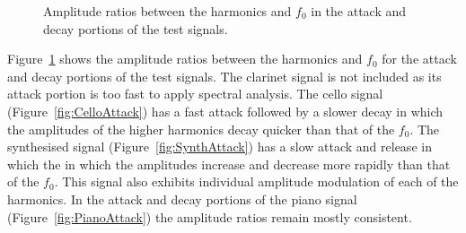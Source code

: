 \begin{figure}[h!]
			\caption{Amplitude ratios between the harmonics and $f_{0}$ in the attack and decay
				 portions of the test signals.}
			\label{fig:AttackAmplitudes}
		\end{figure}

		Figure~\ref{fig:AttackAmplitudes} shows the amplitude ratios between the harmonics and $f_{0}$ for the
		attack and decay portions of the test signals. The clarinet signal is not included as its attack portion is
		too fast to apply spectral analysis. The cello signal (Figure~\ref{fig:CelloAttack}) has a fast attack
		followed by a slower decay in which the amplitudes of the higher harmonics decay quicker than that of the
		$f_{0}$. The synthesised signal (Figure~\ref{fig:SynthAttack}) has a slow attack and release in which the
		in which the amplitudes increase and decrease more rapidly than that of the $f_{0}$. This signal also
		exhibits individual amplitude modulation of each of the harmonics. In the attack and decay portions of the
		piano signal (Figure~\ref{fig:PianoAttack}) the amplitude ratios remain mostly consistent.

